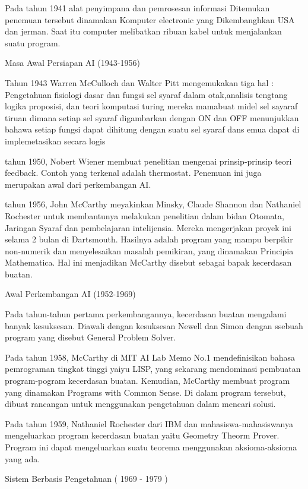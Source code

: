 \documentclass{homework}
\begin{document}
\text Pada tahun 1941 alat penyimpana dan pemrosesan informasi Ditemukan penemuan tersebut dinamakan Komputer electronic yang Dikembanghkan USA dan jerman. Saat itu computer melibatkan ribuan kabel untuk menjalankan suatu program.

Masa Awal Persiapan AI (1943-1956)

\text Tahun 1943 Warren McCulloch dan Walter Pitt mengemukakan tiga hal :
Pengetahuan fisiologi dasar dan fungsi sel syaraf dalam otak,analisis tengtang logika proposisi, dan teori komputasi turing mereka mamabuat midel sel sayaraf tiruan dimana setiap sel syaraf digambarkan dengan ON dan OFF menunjukkan bahawa setiap fungsi dapat dihitung  dengan suatu sel syaraf dans emua dapat di implemetasikan secara logis

\text tahun 1950, Nobert Wiener membuat penelitian mengenai prinsip-prinsip teori feedback. Contoh yang terkenal adalah thermostat. Penemuan ini juga merupakan awal dari perkembangan AI.
 
\text tahun 1956, John McCarthy meyakinkan Minsky, Claude Shannon dan Nathaniel Rochester untuk membantunya melakukan penelitian dalam bidan Otomata, Jaringan Syaraf dan pembelajaran intelijensia. Mereka mengerjakan proyek ini selama 2 bulan di Dartsmouth. Hasilnya adalah program yang mampu berpikir non-numerik dan menyelesaikan masalah pemikiran, yang dinamakan Principia Mathematica. Hal ini menjadikan McCarthy disebut sebagai bapak kecerdasan buatan.

Awal Perkembangan AI (1952-1969)

\text Pada tahun-tahun pertama perkembangannya, kecerdasan buatan mengalami banyak kesuksesan. Diawali dengan kesuksesan Newell dan Simon dengan ssebuah program yang disebut General Problem Solver.

\text Pada tahun 1958, McCarthy di MIT AI Lab Memo No.1 mendefinisikan bahasa pemrograman tingkat tinggi yaiyu LISP, yang sekarang mendominasi pembuatan program-pogram kecerdasan buatan. Kemudian, McCarthy membuat program yang dinamakan Programs with Common Sense. Di dalam program tersebut, dibuat rancangan untuk menggunakan pengetahuan dalam mencari solusi.

\text Pada tahun 1959, Nathaniel Rochester dari IBM dan mahasiswa-mahasiswanya mengeluarkan program kecerdasan buatan yaitu Geometry Theorm Prover. Program ini dapat mengeluarkan suatu teorema menggunakan aksioma-aksioma yang ada.

Sistem Berbasis Pengetahuan ( 1969 - 1979 )
\end{document}
